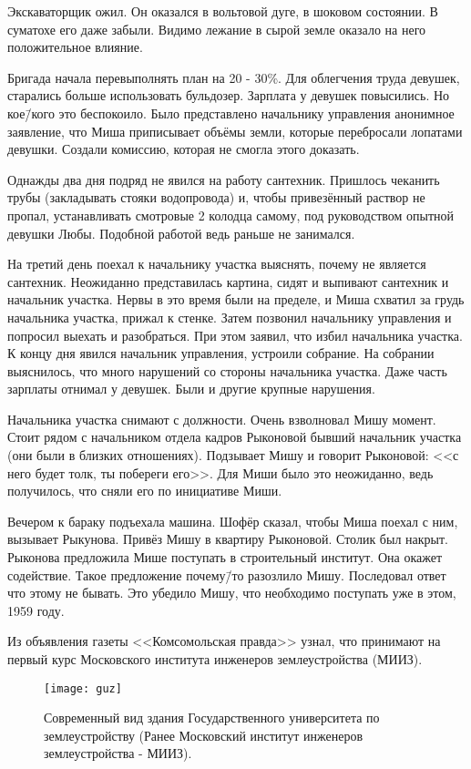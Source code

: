 Экскаваторщик ожил. Он оказался в вольтовой дуге, в шоковом состоянии. В суматохе его даже забыли. Видимо лежание в сырой земле оказало на него положительное влияние. 

Бригада начала перевыполнять план на 20 - 30\%. Для облегчения труда девушек, старались больше использовать бульдозер. Зарплата у девушек повысились. Но кое\=/кого это беспокоило. Было представлено начальнику управления анонимное заявление, что Миша приписывает объёмы земли, которые перебросали лопатами девушки. Создали комиссию, которая не смогла этого доказать.

Однажды два дня подряд не явился на работу сантехник. Пришлось чеканить трубы (закладывать стояки водопровода) и, чтобы привезённый раствор не пропал, устанавливать смотровые 2 колодца самому, под руководством опытной девушки Любы. Подобной работой ведь раньше не занимался.

На третий день поехал к начальнику участка выяснять, почему не является сантехник. Неожиданно представилась картина, сидят и выпивают сантехник и начальник участка. Нервы в это время были на пределе, и Миша схватил за грудь начальника участка, прижал к стенке. Затем позвонил начальнику управления и попросил выехать и разобраться. При этом заявил, что избил начальника участка. К концу дня явился начальник управления, устроили собрание. На собрании выяснилось, что много нарушений со стороны начальника участка. Даже часть зарплаты отнимал у девушек. Были и другие крупные нарушения.

Начальника участка снимают с должности. Очень взволновал Мишу момент. Стоит рядом с начальником отдела кадров Рыконовой бывший начальник участка (они были в близких отношениях). Подзывает Мишу и говорит Рыконовой: <<с него будет толк, ты побереги его>>. Для Миши было это неожиданно, ведь получилось, что сняли его по инициативе Миши. 

Вечером к бараку подъехала машина. Шофёр сказал, чтобы Миша поехал с ним, вызывает Рыкунова. Привёз Мишу в квартиру Рыконовой. Столик был накрыт. Рыконова предложила Мише поступать в строительный институт. Она окажет содействие. Такое предложение почему\=/то разозлило Мишу. Последовал ответ что этому не бывать. Это убедило Мишу, что необходимо поступать уже в этом, 1959 году.

Из объявления газеты <<Комсомольская правда>> узнал, что принимают на первый курс Московского института инженеров землеустройства (МИИЗ).

\begin{wrapfigure}{O}{.4\textwidth}
\centering
\texttt{[image: guz]}
\caption[{Современный вид здания Государственного университета по землеустройству (Ранее Московский институт инженеров землеустройства - МИИЗ).}]{Современный вид здания Государственного университета по землеустройству (Ранее Московский институт инженеров землеустройства - МИИЗ)\footnotemark.}
\label{fig:guz}
\end{wrapfigure}

